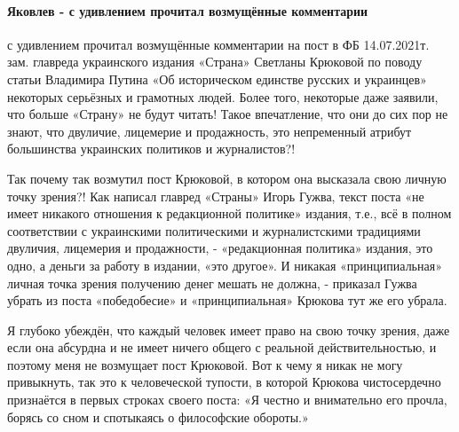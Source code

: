  
 
 
 
 
\paragraph{Яковлев - с удивлением прочитал возмущённые комментарии}
\label{sec:14_07_2021.fb.krjukova_svetlana.1.statja_putina_mnenie.cmt.jakovlev_udivlenie}

\begin{itemize}
 

с удивлением прочитал возмущённые комментарии на пост в ФБ 14.07.2021т. зам.
главреда украинского издания «Страна» Светланы Крюковой по поводу статьи
Владимира Путина «Об историческом единстве русских и украинцев» некоторых
серьёзных и грамотных людей. Более того, некоторые даже заявили, что больше
«Страну» не будут читать! Такое впечатление, что они до сих пор не знают, что
двуличие, лицемерие и продажность, это непременный атрибут большинства
украинских политиков и журналистов?!

Так почему так возмутил пост Крюковой, в котором она высказала свою личную
точку зрения?! Как написал главред «Страны» Игорь Гужва, текст поста «не имеет
никакого отношения к редакционной политике» издания, т.е., всё в полном
соответствии с украинскими политическими и журналистскими традициями двуличия,
лицемерия и продажности, - «редакционная политика» издания, это одно, а деньги
за работу в издании, «это другое». И никакая «принципиальная» личная точка
зрения получению денег мешать не должна, - приказал Гужва убрать из поста
«победобесие» и «принципиальная» Крюкова тут же его убрала.

Я глубоко убеждён, что каждый человек имеет право на свою точку зрения, даже
если она абсурдна и не имеет ничего общего с реальной действительностью, и
поэтому меня не возмущает пост Крюковой. Вот к чему я никак не могу привыкнуть,
так это к человеческой тупости, в которой Крюкова чистосердечно признаётся в
первых строках своего поста: «Я честно и внимательно его прочла, борясь со сном
и спотыкаясь о философские обороты.» 


\end{itemize}
